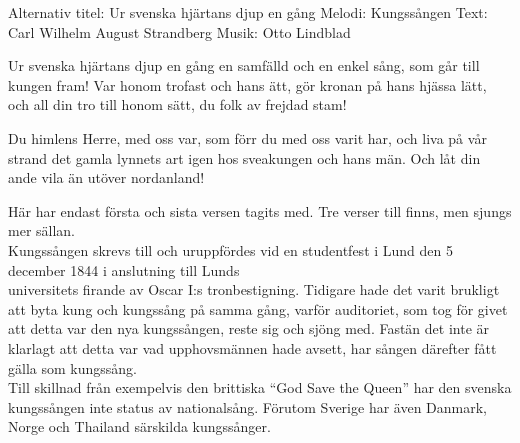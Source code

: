\begin{song}


\begin{songmeta}
Alternativ titel: Ur svenska hjärtans djup en gång
Melodi: Kungssången
Text: Carl Wilhelm August Strandberg
Musik: Otto Lindblad
\end{songmeta}

\begin{songtext}
Ur svenska hjärtans djup en gång
en samfälld och en enkel sång,
som går till kungen fram!
Var honom trofast och hans ätt,
gör kronan på hans hjässa lätt,
och all din tro till honom sätt,
du folk av frejdad stam!

Du himlens Herre, med oss var,
som förr du med oss varit har,
och liva på vår strand
det gamla lynnets art igen
hos sveakungen och hans män.
Och låt din ande vila än
utöver nordanland!
\end{songtext}

\newpage
\begin{songnotes}
Här har endast första och sista versen tagits med. Tre verser till finns, men
sjungs mer sällan. \\
Kungssången skrevs till och uruppfördes vid en studentfest i Lund den 5 december
1844 i anslutning till Lunds \\ universitets firande av Oscar I:s tronbestigning.
Tidigare hade det varit brukligt att byta kung och kungssång på samma gång,
varför auditoriet, som tog för givet att detta var den nya kungssången, reste
sig och sjöng med. Fastän det inte är klarlagt att detta var vad
upphovsmännen hade avsett, har sången därefter fått gälla som kungssång. \\
Till skillnad från exempelvis den brittiska ``God Save the Queen'' har den
svenska kungssången inte status av nationalsång. Förutom Sverige har även
Danmark, Norge och Thailand särskilda kungssånger.
\end{songnotes}

\end{song}
